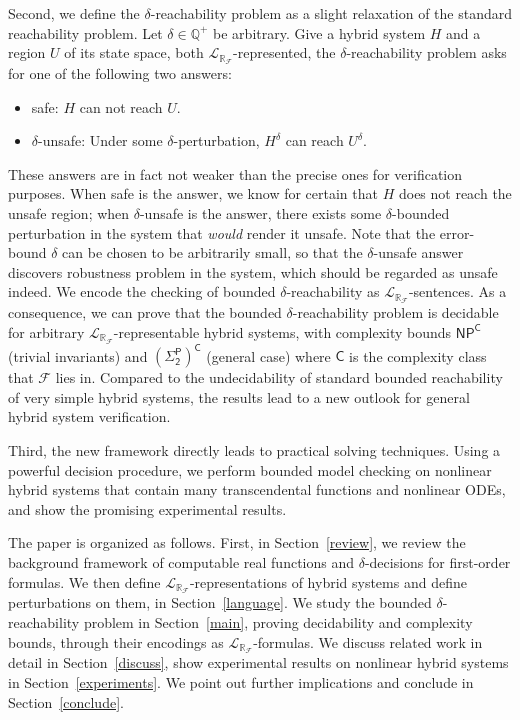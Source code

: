 \documentclass[envcountsect]{llncs}
\newcommand{\lrf}{\mathcal{L}_{\mathbb{R}_{\mathcal{F}}}}
\begin{document}
Second, we define the $\delta$-reachability problem as a slight
relaxation of the standard reachability problem. Let $\delta\in \mathbb{Q}^+$ be
arbitrary. Give a hybrid system $H$ and a region $U$ of its state
space, both $\lrf$-represented, the $\delta$-reachability problem asks for
one of the following two answers:
\begin{itemize}
 \item {\sf safe}: $H$ can not reach $U$.
 \item {\sf $\delta$-unsafe}: Under some $\delta$-perturbation, $H^{\delta}$ can
reach $U^{\delta}$. 
\end{itemize}
These answers are in fact not weaker than the precise ones for
verification purposes. When {\sf safe} is the answer, we know for certain
that $H$ does not reach the unsafe region; when {\sf $\delta$-unsafe} is the
answer, there exists some $\delta$-bounded perturbation in the
system that {\em would} render it unsafe. Note that the error-bound $\delta$ can
be chosen to be arbitrarily small, so that the {\sf$\delta$-unsafe} answer
discovers robustness problem in the system, which should be regarded as unsafe
indeed. We encode the checking of bounded $\delta$-reachability as
$\lrf$-sentences. As a consequence, we can prove that the bounded
$\delta$-reachability problem is decidable for arbitrary
$\lrf$-representable hybrid systems, with complexity bounds $\mathsf{NP^C}$
(trivial invariants) and $\mathsf{(\Sigma_2^P)^C}$ (general case) where
$\mathsf{C}$ is the complexity class that $\mathcal{F}$ lies in. Compared to the
 undecidability of standard bounded reachability of very simple hybrid systems,
the results lead to a new outlook for general hybrid system
verification. 

Third, the new framework directly leads to practical solving techniques. Using a
powerful decision procedure, we perform bounded model checking on nonlinear
hybrid systems that contain many transcendental
functions and nonlinear ODEs, and show the promising experimental results. 

The paper is organized as follows. First, in
Section~\ref{review}, we review the background framework of
computable real functions and $\delta$-decisions for first-order formulas. We
then define $\lrf$-representations of hybrid systems and define perturbations
on them, in Section~\ref{language}. We
study the bounded $\delta$-reachability problem in
Section~\ref{main}, proving decidability and complexity bounds, through their
encodings as $\lrf$-formulas. We discuss related work in detail in
Section~\ref{discuss}, show experimental results on nonlinear hybrid systems
in Section~\ref{experiments}. We point out further implications and conclude in
Section~\ref{conclude}.
\end{document}

